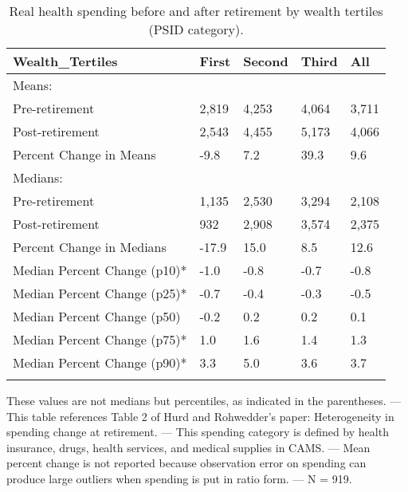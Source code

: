 \begin{table}[tbp] \centering
{}

\caption{Real health spending before and after retirement by wealth tertiles (PSID category).}
\begin{tabularx}{\textwidth}{lCCCC}

\toprule
{Wealth\_Tertiles}&{First}&{Second}&{Third}&{All} \tabularnewline
\midrule\addlinespace[1.5ex]
Means:&&&& \tabularnewline
\midrule Pre-retirement&2,819&4,253&4,064&3,711 \tabularnewline
Post-retirement&2,543&4,455&5,173&4,066 \tabularnewline
Percent Change in Means&-9.8&7.2&39.3&9.6 \tabularnewline
\midrule Medians:&&&& \tabularnewline
\midrule Pre-retirement&1,135&2,530&3,294&2,108 \tabularnewline
Post-retirement&932&2,908&3,574&2,375 \tabularnewline
Percent Change in Medians&-17.9&15.0&8.5&12.6 \tabularnewline
Median Percent Change (p10)*&-1.0&-0.8&-0.7&-0.8 \tabularnewline
Median Percent Change (p25)*&-0.7&-0.4&-0.3&-0.5 \tabularnewline
Median Percent Change (p50)&-0.2&0.2&0.2&0.1 \tabularnewline
Median Percent Change (p75)*&1.0&1.6&1.4&1.3 \tabularnewline
Median Percent Change (p90)*&3.3&5.0&3.6&3.7 \tabularnewline
\bottomrule \addlinespace[1.5ex]

\end{tabularx}
\begin{flushleft}
\footnotesize *These values are not medians but percentiles, as indicated in the parentheses. \linebreak --- \linebreak This table references Table 2 of Hurd and Rohwedder's paper: Heterogeneity in spending change at retirement. \linebreak --- \linebreak This spending category is defined by health insurance, drugs, health services, and medical supplies in CAMS. \linebreak --- \linebreak Mean percent change is not reported because observation error on spending can produce large outliers when spending is put in ratio form. \linebreak --- \linebreak N = 919.
\end{flushleft}
\end{table}
